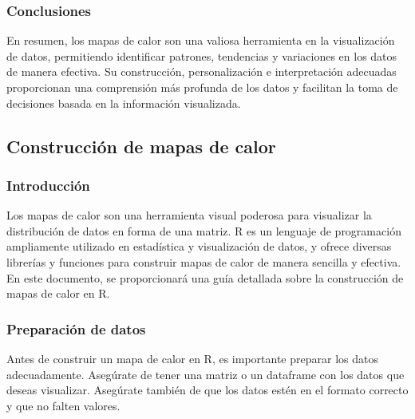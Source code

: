 \documentclass{article}
\begin{document}
\subsubsection*{Conclusiones}
En resumen, los mapas de calor son una valiosa herramienta en la visualización de datos, permitiendo identificar patrones, tendencias y variaciones en los datos de manera efectiva. Su construcción, personalización e interpretación adecuadas proporcionan una comprensión más profunda de los datos y facilitan la toma de decisiones basada en la información visualizada.


\subsection{Construcción de mapas de calor}

\subsubsection{Introducción}
Los mapas de calor son una herramienta visual poderosa para visualizar la distribución de datos en forma de una matriz. R es un lenguaje de programación ampliamente utilizado en estadística y visualización de datos, y ofrece diversas librerías y funciones para construir mapas de calor de manera sencilla y efectiva. En este documento, se proporcionará una guía detallada sobre la construcción de mapas de calor en R.

\subsubsection{Preparación de datos}
Antes de construir un mapa de calor en R, es importante preparar los datos adecuadamente. Asegúrate de tener una matriz o un dataframe con los datos que deseas visualizar. Asegúrate también de que los datos estén en el formato correcto y que no falten valores.

\end{document}
